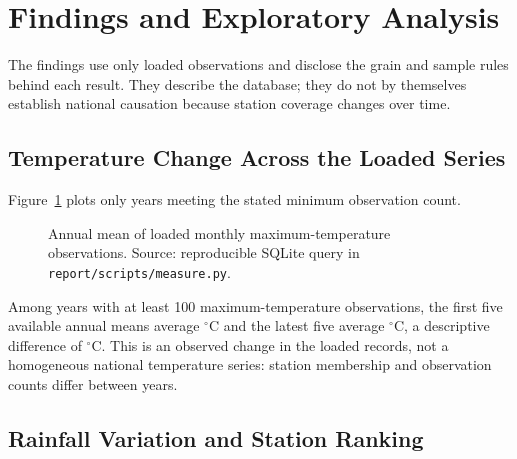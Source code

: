\section{Findings and Exploratory Analysis}
\label{sec:findings}

The findings use only loaded observations and disclose the grain and sample
rules behind each result. They describe the database; they do not by themselves
establish national causation because station coverage changes over time.

\subsection{Temperature Change Across the Loaded Series}
\label{subsec:temperature-findings}

Figure~\ref{fig:annual-temperature} plots only years meeting the stated
minimum observation count.

\begin{figure}[H]
\centering
{}
\caption{Annual mean of loaded monthly maximum-temperature observations.
Source: reproducible SQLite query in \texttt{report/scripts/measure.py}.}
\label{fig:annual-temperature}
\end{figure}

Among years with at least 100 maximum-temperature observations, the first five
available annual means average \mTempEarlyMean$^\circ$C and the latest five
average \mTempRecentMean$^\circ$C, a descriptive difference of
\mTempDifference$^\circ$C. This is an observed change in the loaded records,
not a homogeneous national temperature series: station membership and
observation counts differ between years.

\subsection{Rainfall Variation and Station Ranking}
\label{subsec:rainfall-findings}

